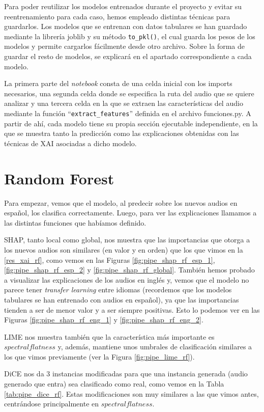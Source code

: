 Para poder reutilizar los modelos entrenados durante el proyecto y evitar su reentrenamiento para cada caso, hemos empleado distintas técnicas para guardarlos. Los modelos que se entrenan con datos tabulares se han guardado mediante la librería joblib y su método \texttt{to\_pkl()}, el cual guarda los pesos de los modelos y permite cargarlos fácilmente desde otro archivo. Sobre la forma de guardar el resto de modelos, se explicará en el apartado correspondiente a cada modelo.

La primera parte del \textit{notebook} consta de una celda inicial con los imports necesarios, una segunda celda donde se especifica la ruta del audio que se quiere analizar y una tercera celda en la que se extraen las características del audio mediante la función ``\texttt{extract\_features}'' definida en el archivo funciones.py. A partir de ahí, cada modelo tiene su propia sección ejecutable independiente, en la que se muestra tanto la predicción como las explicaciones obtenidas con las técnicas de XAI asociadas a dicho modelo.

\section{Random Forest}

Para empezar, vemos que el modelo, al predecir sobre los nuevos audios en español, los clasifica correctamente. Luego, para ver las explicaciones llamamos a las distintas funciones que habíamos definido. 

SHAP, tanto local como global, nos muestra que las importancias que otorga a los nuevos audios son similares (en valor y en orden) que los que vimos en la \autoref{res_xai_rf}, como vemos en las Figuras \ref{fig:pipe_shap_rf_esp_1}, \ref{fig:pipe_shap_rf_esp_2} y \ref{fig:pipe_shap_rf_global}. También hemos probado a visualizar las explicaciones de los audios en inglés y, vemos que el modelo no parece tener \emph{transfer learning} entre idiomas (recordemos que los modelos tabulares se han entrenado con audios en español), ya que las importancias tienden a ser de menor valor y a ser siempre positivas. Esto lo podemos ver en las Figuras \ref{fig:pipe_shap_rf_eng_1} y \ref{fig:pipe_shap_rf_eng_2}.

LIME nos muestra también que la característica más importante es $spectral flatness$ y, además, mantiene unos umbrales de clasificación similares a los que vimos previamente (ver la Figura \ref{fig:pipe_lime_rf}).

DiCE nos da 3 instancias modificadas para que una instancia generada (audio generado que entra) sea clasificado como real, como vemos en la Tabla \ref{tab:pipe_dice_rf}. Estas modificaciones son muy similares a las que vimos antes, centrándose principalmente en $spectral flatness$.

